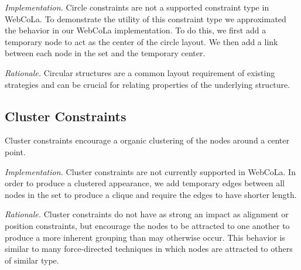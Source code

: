 \emph{Implementation.}
Circle constraints are not a supported constraint type in WebCoLa. To 
demonstrate the utility of this constraint type we approximated the behavior
in our WebCoLa implementation. To do this, we first add a temporary node
to act as the center of the circle layout. We then add a link between each 
node in the set and the temporary center. 


\emph{Rationale.} Circular structures are a common layout requirement of
existing strategies  and can be crucial for relating
properties of the underlying structure.

\subsection{Cluster Constraints}

Cluster constraints encourage a organic clustering of the nodes around
a center point.


\emph{Implementation.}
Cluster constraints are not currently supported in WebCoLa. In order to
produce a clustered appearance, we add temporary edges between all nodes
in the set to produce a clique and require the edges to have shorter length.

\emph{Rationale.}
Cluster constraints do not have as strong an impact as alignment or
position constraints, but encourage the nodes to be attracted to one
another to produce a more inherent grouping than may otherwise occur.
This behavior is similar to many force-directed techniques in which
nodes are attracted to others of similar type.


